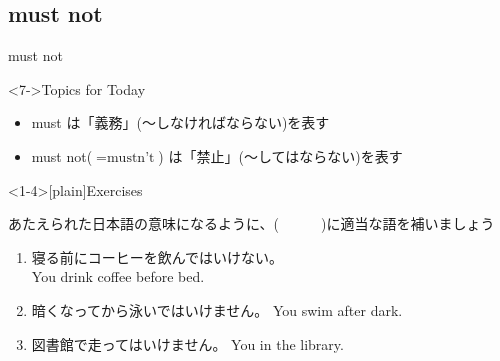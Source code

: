 \documentclass[aspectratio=169,xcolor={dvipsnames,table}]{beamer}
\newcommand{\myaudio}[1]{\href{#1}{\faVolumeUp}}
\begin{document}
\subsection{must not}
\begin{frame}[plain]{must not}
 
\Large


\vspace{-10pt}
\mbox{}\hfill{}



\hfill{}

\hfill{{\scriptsize \myaudio{./audio/013_must_04.mp3}}}

\vfill

\begin{exampleblock}<7->{Topics for Today}
\begin{itemize}[square]\small
 \item must は「義務」(〜しなければならない)を表す
 \item must not($=\text{mustn't}$) は「禁止」(〜してはならない)を表す
 \end{itemize}
     \end{exampleblock}

\end{frame}
\begin{frame}<1-4>[plain]{Exercises}
 
あたえられた日本語の意味になるように、(~~~~~~)に適当な語を補いましょう
\hfill{\myaudio{./audio/013_must_05.mp3}}


\begin{enumerate}
 \item 寝る前にコーヒーを飲んではいけない。\\
You  drink coffee before bed.
 \item 暗くなってから泳いではいけません。 You  swim after dark.
 \item 図書館で走ってはいけません。 You   in the library.
\end{enumerate}
\end{frame}
\end{document}
